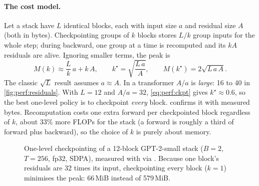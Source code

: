\paragraph{The cost model.} Let a stack have $L$ identical blocks, each with input size $a$ and
residual size $A$ (both in bytes). Checkpointing groups of $k$ blocks stores $L/k$ group inputs
for the whole step; during backward, one group at a time is recomputed and its $kA$ residuals are
alive. Ignoring smaller terms, the peak is
\begin{equation}
M(k) \approx \frac{L}{k}\,a + k\,A,
\qquad
k^\star = \sqrt{\frac{L\,a}{A}},
\qquad
M(k^\star) = 2\sqrt{L\,a\,A}.
\label{eq:perf:ckpt}
\end{equation}
The classic $\sqrt L$ result assumes $a\approx A$. In a transformer $A/a$ is \emph{large}: 16 to 40 in
\cref{fig:perf:residuals}. With $L=12$ and $A/a=32$, \cref{eq:perf:ckpt} gives $k^\star\approx0.6$, so the
best one-level policy is to checkpoint \emph{every} block.  confirms it with
measured bytes. Recomputation costs one extra forward per checkpointed block regardless of $k$,
about 33\% more FLOPs for the stack (a forward is roughly a third of forward plus backward), so the
choice of $k$ is purely about memory.

\begin{figure}[t]
\centering
{}
\caption{One-level checkpointing of a 12-block GPT-2-small stack ($B=2$, $T=256$, fp32, SDPA),
measured with  via . Because one block's residuals
are 32 times its input, checkpointing every block ($k=1$) minimises the peak: 66\,MiB instead of
579\,MiB.}
\label{fig:perf:ckpt}
\end{figure}

